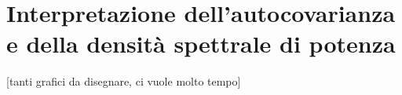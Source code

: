 \section{Interpretazione dell'autocovarianza e della densità spettrale di potenza}
[tanti grafici da disegnare, ci vuole molto tempo]
